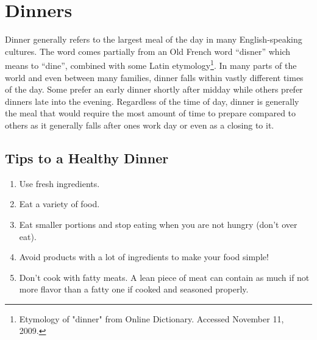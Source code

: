 \AddToShipoutPicture*{\Steak}
\chapter{Dinners}

Dinner generally refers to the largest meal of the day in many English-speaking cultures. The word comes partially from an Old French word ``disner'' which means to ``dine'', combined with some Latin etymology\footnote{Etymology of "dinner" from Online Dictionary. Accessed November 11, 2009.}. In many parts of the world and even between many families, dinner falls within vastly different times of the day. Some prefer an early dinner shortly after midday while others prefer dinners late into the evening. Regardless of the time of day, dinner is generally the meal that would require the most amount of time to prepare compared to others as it generally falls after ones work day or even as a closing to it.

\section*{Tips to a Healthy Dinner}
\begin{enumerate}
	\item Use fresh ingredients.
	\item Eat a variety of food.
	\item Eat smaller portions and stop eating when you are not hungry (don't over eat).
	\item Avoid products with a lot of ingredients to make your food simple!
	\item Don't cook with fatty meats. A lean piece of meat can contain as much if not more flavor than a fatty one if cooked and seasoned properly.
\end{enumerate}